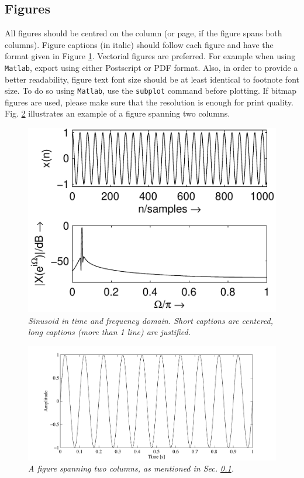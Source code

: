 \documentclass{article}
\begin{document}
\subsection{Figures}
\label{ssec:figures}
All figures should be centred on the column (or page, if the figure spans both columns).
Figure captions (in italic) should follow each figure and have the format given in Figure \ref{fft_plot}.
%
Vectorial figures are preferred. For example when using
\texttt{Matlab}, export using either Postscript or PDF format. Also,
in order to provide a better readability, figure text font size
should be at least identical to footnote font size. To do so using
\texttt{Matlab}, use the \texttt{subplot} command before plotting.
If bitmap figures are used, please make sure that the resolution is
enough for print quality. Fig. \ref{ftt_plot2} illustrates an
example of a figure spanning two columns.
%
\begin{figure}[ht]
\centerline{\includegraphics[scale=0.8]{fft_plot2}}
\caption{\label{fft_plot}{\it Sinusoid in time and frequency domain. Short captions are centered, long captions (more than 1 line) are justified.}}
\end{figure}
%
\begin{figure}[ht]
\center
\includegraphics[width=5in]{TwoColumnSine2}
\caption{\label{ftt_plot2}{\it A figure spanning two columns, as mentioned in Sec. \ref{ssec:figures}. }}
\end{figure}
\end{document}
